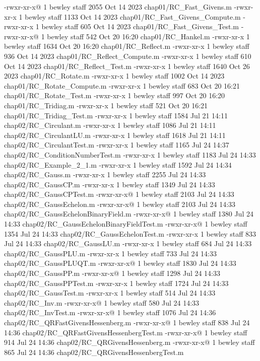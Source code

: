 -rwxr-xr-x@ 1 bewley  staff   2055 Oct 14  2023 chap01/RC_Fast_Givens.m
-rwxr-xr-x  1 bewley  staff   1133 Oct 14  2023 chap01/RC_Fast_Givens_Compute.m
-rwxr-xr-x  1 bewley  staff    605 Oct 14  2023 chap01/RC_Fast_Givens_Test.m
-rwxr-xr-x@ 1 bewley  staff    542 Oct 20 16:20 chap01/RC_Hankel.m
-rwxr-xr-x  1 bewley  staff   1634 Oct 20 16:20 chap01/RC_Reflect.m
-rwxr-xr-x  1 bewley  staff    936 Oct 14  2023 chap01/RC_Reflect_Compute.m
-rwxr-xr-x  1 bewley  staff    610 Oct 14  2023 chap01/RC_Reflect_Test.m
-rwxr-xr-x  1 bewley  staff   1640 Oct 26  2023 chap01/RC_Rotate.m
-rwxr-xr-x  1 bewley  staff   1002 Oct 14  2023 chap01/RC_Rotate_Compute.m
-rwxr-xr-x  1 bewley  staff    683 Oct 20 16:21 chap01/RC_Rotate_Test.m
-rwxr-xr-x  1 bewley  staff    997 Oct 20 16:20 chap01/RC_Tridiag.m
-rwxr-xr-x  1 bewley  staff    521 Oct 20 16:21 chap01/RC_Tridiag_Test.m
-rwxr-xr-x  1 bewley  staff   1584 Jul 21 14:11 chap02/RC_Circulant.m
-rwxr-xr-x  1 bewley  staff   1086 Jul 21 14:11 chap02/RC_CirculantLU.m
-rwxr-xr-x  1 bewley  staff   1618 Jul 21 14:11 chap02/RC_CirculantTest.m
-rwxr-xr-x  1 bewley  staff   1165 Jul 24 14:37 chap02/RC_ConditionNumberTest.m
-rwxr-xr-x  1 bewley  staff   1183 Jul 24 14:33 chap02/RC_Example_2_1.m
-rwxr-xr-x  1 bewley  staff   1592 Jul 24 14:34 chap02/RC_Gauss.m
-rwxr-xr-x  1 bewley  staff   2255 Jul 24 14:33 chap02/RC_GaussCP.m
-rwxr-xr-x  1 bewley  staff   1349 Jul 24 14:33 chap02/RC_GaussCPTest.m
-rwxr-xr-x@ 1 bewley  staff   2103 Jul 24 14:33 chap02/RC_GaussEchelon.m
-rwxr-xr-x@ 1 bewley  staff   2103 Jul 24 14:33 chap02/RC_GaussEchelonBinaryField.m
-rwxr-xr-x@ 1 bewley  staff   1380 Jul 24 14:33 chap02/RC_GaussEchelonBinaryFieldTest.m
-rwxr-xr-x@ 1 bewley  staff   1354 Jul 24 14:33 chap02/RC_GaussEchelonTest.m
-rwxr-xr-x  1 bewley  staff    833 Jul 24 14:33 chap02/RC_GaussLU.m
-rwxr-xr-x  1 bewley  staff    684 Jul 24 14:33 chap02/RC_GaussPLU.m
-rwxr-xr-x  1 bewley  staff    733 Jul 24 14:33 chap02/RC_GaussPLUQT.m
-rwxr-xr-x@ 1 bewley  staff   1830 Jul 24 14:33 chap02/RC_GaussPP.m
-rwxr-xr-x@ 1 bewley  staff   1298 Jul 24 14:33 chap02/RC_GaussPPTest.m
-rwxr-xr-x  1 bewley  staff   1724 Jul 24 14:33 chap02/RC_GaussTest.m
-rwxr-xr-x  1 bewley  staff    514 Jul 24 14:33 chap02/RC_Inv.m
-rwxr-xr-x@ 1 bewley  staff    580 Jul 24 14:33 chap02/RC_InvTest.m
-rwxr-xr-x@ 1 bewley  staff   1076 Jul 24 14:36 chap02/RC_QRFastGivensHessenberg.m
-rwxr-xr-x@ 1 bewley  staff    838 Jul 24 14:36 chap02/RC_QRFastGivensHessenbergTest.m
-rwxr-xr-x@ 1 bewley  staff    914 Jul 24 14:36 chap02/RC_QRGivensHessenberg.m
-rwxr-xr-x@ 1 bewley  staff    865 Jul 24 14:36 chap02/RC_QRGivensHessenbergTest.m

